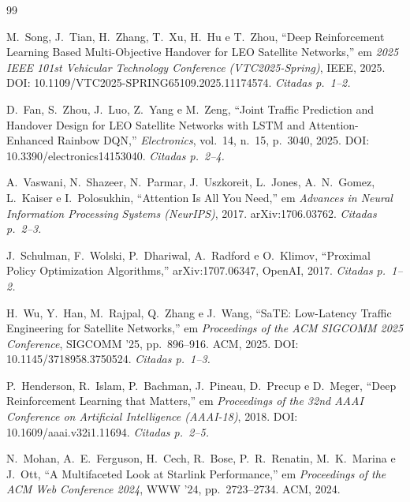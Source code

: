 \documentclass[12pt,a4paper]{article}
\begin{document}
\begin{thebibliography}{99}

M.~Song, J.~Tian, H.~Zhang, T.~Xu, H.~Hu e T.~Zhou,
``Deep Reinforcement Learning Based Multi-Objective Handover for LEO Satellite Networks,''
em \textit{2025 IEEE 101st Vehicular Technology Conference (VTC2025-Spring)},
IEEE, 2025. DOI: 10.1109/VTC2025-SPRING65109.2025.11174574.
\textit{Citadas p.~1--2.}

D.~Fan, S.~Zhou, J.~Luo, Z.~Yang e M.~Zeng,
``Joint Traffic Prediction and Handover Design for LEO Satellite Networks with LSTM and Attention-Enhanced Rainbow DQN,''
\textit{Electronics}, vol.~14, n.~15, p.~3040, 2025.
DOI: 10.3390/electronics14153040.
\textit{Citadas p.~2--4.}

A.~Vaswani, N.~Shazeer, N.~Parmar, J.~Uszkoreit, L.~Jones, A.~N.~Gomez,
L.~Kaiser e I.~Polosukhin,
``Attention Is All You Need,''
em \textit{Advances in Neural Information Processing Systems (NeurIPS)}, 2017.
arXiv:1706.03762.
\textit{Citadas p.~2--3.}

J.~Schulman, F.~Wolski, P.~Dhariwal, A.~Radford e O.~Klimov,
``Proximal Policy Optimization Algorithms,''
arXiv:1707.06347, OpenAI, 2017.
\textit{Citadas p.~1--2.}

H.~Wu, Y.~Han, M.~Rajpal, Q.~Zhang e J.~Wang,
``SaTE: Low-Latency Traffic Engineering for Satellite Networks,''
em \textit{Proceedings of the ACM SIGCOMM 2025 Conference}, SIGCOMM '25,
pp.~896--916. ACM, 2025. DOI: 10.1145/3718958.3750524.
\textit{Citadas p.~1--3.}

P.~Henderson, R.~Islam, P.~Bachman, J.~Pineau, D.~Precup e D.~Meger,
``Deep Reinforcement Learning that Matters,''
em \textit{Proceedings of the 32nd AAAI Conference on Artificial Intelligence (AAAI-18)},
2018. DOI: 10.1609/aaai.v32i1.11694.
\textit{Citadas p.~2--5.}

N.~Mohan, A.~E.~Ferguson, H.~Cech, R.~Bose, P.~R.~Renatin, M.~K.~Marina e J.~Ott,
``A Multifaceted Look at Starlink Performance,''
em \textit{Proceedings of the ACM Web Conference 2024}, WWW '24,
pp.~2723--2734. ACM, 2024.

\end{thebibliography}
\end{document}
